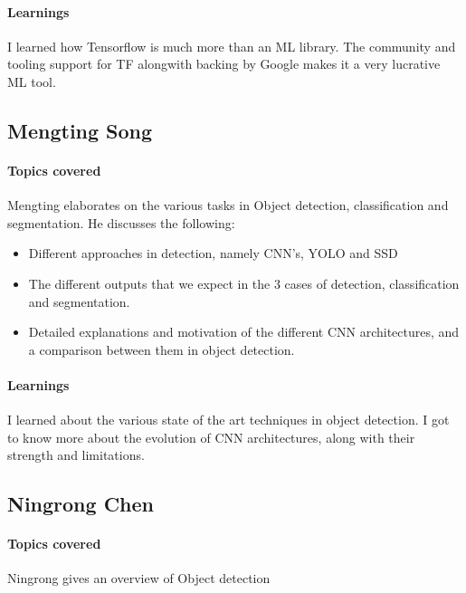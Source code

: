 \documentclass{article}
\begin{document}
			\paragraph{Learnings}
			I learned how Tensorflow is much more than an ML library. The community and tooling support for TF alongwith backing by Google makes it a very lucrative ML tool.
			
		\subsection{Mengting Song}
			\paragraph{Topics covered}
			Mengting elaborates on the various tasks in Object detection, classification and segmentation. He discusses the following:
			\begin{itemize}
				\item Different approaches in detection, namely CNN's, YOLO and SSD
				\item The different outputs that we expect in the 3 cases of detection, classification and segmentation.
				\item Detailed explanations and motivation of the different CNN architectures, and a comparison between them in object detection.
			\end{itemize}
			\paragraph{Learnings}
			I learned about the various state of the art techniques in object detection. I got to know more about the evolution of CNN architectures, along with their strength and limitations.
			
		\subsection{Ningrong Chen}
			\paragraph{Topics covered}
			Ningrong gives an overview of Object detection 
		
	
			
		
\end{document}

